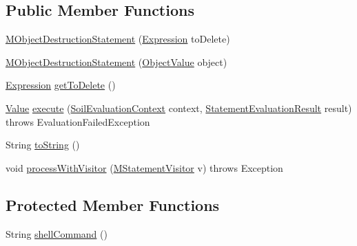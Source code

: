 \subsection*{Public Member Functions}
\begin{DoxyCompactItemize}
\item 
\hyperlink{classorg_1_1tzi_1_1use_1_1uml_1_1sys_1_1soil_1_1_m_object_destruction_statement_a4842028fe6acceaec28d8e271024b2cc}{M\-Object\-Destruction\-Statement} (\hyperlink{classorg_1_1tzi_1_1use_1_1uml_1_1ocl_1_1expr_1_1_expression}{Expression} to\-Delete)
\item 
\hyperlink{classorg_1_1tzi_1_1use_1_1uml_1_1sys_1_1soil_1_1_m_object_destruction_statement_ad396a2e360ff66b9e9a6de5e7b2176bb}{M\-Object\-Destruction\-Statement} (\hyperlink{classorg_1_1tzi_1_1use_1_1uml_1_1ocl_1_1value_1_1_object_value}{Object\-Value} object)
\item 
\hyperlink{classorg_1_1tzi_1_1use_1_1uml_1_1ocl_1_1expr_1_1_expression}{Expression} \hyperlink{classorg_1_1tzi_1_1use_1_1uml_1_1sys_1_1soil_1_1_m_object_destruction_statement_adadda9c21212e485be0fc3953a3e9b29}{get\-To\-Delete} ()
\item 
\hyperlink{classorg_1_1tzi_1_1use_1_1uml_1_1ocl_1_1value_1_1_value}{Value} \hyperlink{classorg_1_1tzi_1_1use_1_1uml_1_1sys_1_1soil_1_1_m_object_destruction_statement_ae22c674d7730447d063270f811e6c3ee}{execute} (\hyperlink{classorg_1_1tzi_1_1use_1_1uml_1_1sys_1_1soil_1_1_soil_evaluation_context}{Soil\-Evaluation\-Context} context, \hyperlink{classorg_1_1tzi_1_1use_1_1uml_1_1sys_1_1_statement_evaluation_result}{Statement\-Evaluation\-Result} result)  throws Evaluation\-Failed\-Exception 
\item 
String \hyperlink{classorg_1_1tzi_1_1use_1_1uml_1_1sys_1_1soil_1_1_m_object_destruction_statement_aecc6c72876c036c22b075f233835e6e7}{to\-String} ()
\item 
void \hyperlink{classorg_1_1tzi_1_1use_1_1uml_1_1sys_1_1soil_1_1_m_object_destruction_statement_a80b516d22d21395936c947ee6aa44814}{process\-With\-Visitor} (\hyperlink{interfaceorg_1_1tzi_1_1use_1_1uml_1_1sys_1_1soil_1_1_m_statement_visitor}{M\-Statement\-Visitor} v)  throws Exception 
\end{DoxyCompactItemize}
\subsection*{Protected Member Functions}
\begin{DoxyCompactItemize}
\item 
String \hyperlink{classorg_1_1tzi_1_1use_1_1uml_1_1sys_1_1soil_1_1_m_object_destruction_statement_a9847184ae148e683e5cc51be45dea26f}{shell\-Command} ()
\end{DoxyCompactItemize}


